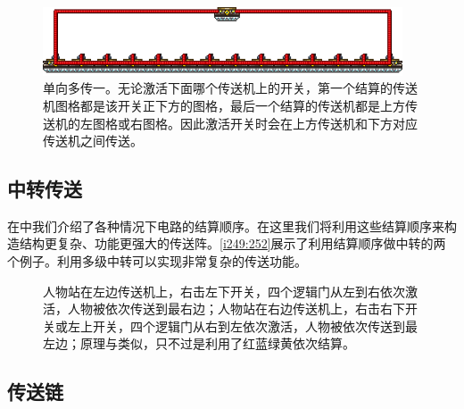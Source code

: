 \begin{figure}[!ht]
\centering
\includegraphics[width=0.95\textwidth]{images/248.png}
\caption{单向多传一。无论激活下面哪个传送机上的开关，第一个结算的传送机图格都是该开关正下方的图格，最后一个结算的传送机都是上方传送机的左图格或右图格。因此激活开关时会在上方传送机和下方对应传送机之间传送。}
\label{i247:248}
\end{figure}

\subsection{中转传送}
在中我们介绍了各种情况下电路的结算顺序。在这里我们将利用这些结算顺序来构造结构更复杂、功能更强大的传送阵。\autoref{i249:252}展示了利用结算顺序做中转的两个例子。利用多级中转可以实现非常复杂的传送功能。

\begin{figure}[!ht]
\begin{center}
\qquad
{}
\end{center}
\caption{\protect{}人物站在左边传送机上，右击左下开关，四个逻辑门从左到右依次激活，人物被依次传送到最右边；人物站在右边传送机上，右击右下开关或左上开关，四个逻辑门从右到左依次激活，人物被依次传送到最左边；\protect{}原理与\protect{}类似，只不过是利用了红蓝绿黄依次结算。}
\label{i249:252}
\end{figure}

\subsection{传送链}

